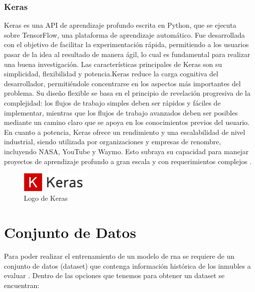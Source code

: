 \subsubsection{Keras}
Keras es una API de aprendizaje profundo escrita en Python, que se ejecuta sobre
TensorFlow, una plataforma de aprendizaje automático. Fue desarrollada con el
objetivo de facilitar la experimentación rápida, permitiendo a los usuarios
pasar de la idea al resultado de manera ágil, lo cual es fundamental para
realizar una buena investigación. Las características principales de Keras son su simplicidad, flexibilidad y
potencia.Keras reduce la carga cognitiva
del desarrollador, permitiéndole concentrarse en los aspectos más importantes
del problema. Su diseño flexible se basa en el principio de revelación
progresiva de la complejidad: los flujos de trabajo simples deben ser rápidos
y fáciles de implementar, mientras que los flujos de trabajo avanzados deben
ser posibles mediante un camino claro que se apoya en los conocimientos previos
del usuario. En cuanto a potencia, Keras ofrece un rendimiento y una escalabilidad
de nivel industrial, siendo utilizada por organizaciones y empresas de renombre,
incluyendo NASA, YouTube y Waymo. Esto subraya su capacidad para manejar
proyectos de aprendizaje profundo a gran escala y con requerimientos complejos \cite{keras}.

\begin{figure}[!htbp]
  \centering
  \includegraphics[width=0.3\textwidth]{imagenes/02-marco-teorico/keras-logo.png}
  \caption[Logo de Keras]{Logo de Keras \cite{keras}}
  \label{fig:keras-logo}
\end{figure}

\section{Conjunto de Datos}
Para poder realizar el entrenamiento de un modelo de \acrshort{rna} se requiere
de un conjunto de datos (\gls{dataset}) que contenga información histórica de
los inmubles a evaluar \cite{pagourtzi2003}. Dentro de las opciones que tenemos para obtener un
\gls{dataset} se encuentran:

